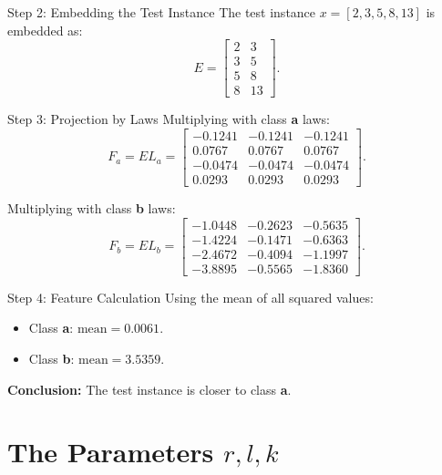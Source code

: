 \documentclass{beamer}
\begin{document}
\begin{frame}{Step 2: Embedding the Test Instance}
  The test instance \( x = [2, 3, 5, 8, 13] \) is embedded as:
  \begin{equation}
    E = \begin{bmatrix} 2 & 3 \\ 3 & 5 \\ 5 & 8 \\ 8 & 13 \end{bmatrix}.
  \end{equation}
\end{frame}

\begin{frame}{Step 3: Projection by Laws}
  Multiplying with class \textbf{a} laws:
  \begin{equation}
    F_a = E L_a = \begin{bmatrix} -0.1241 & -0.1241 & -0.1241 \\ 0.0767 & 0.0767 & 0.0767 \\ -0.0474 & -0.0474 & -0.0474 \\ 0.0293 & 0.0293 & 0.0293 \end{bmatrix}.
  \end{equation}

  Multiplying with class \textbf{b} laws:
  \begin{equation}
    F_b = E L_b = \begin{bmatrix} -1.0448 & -0.2623 & -0.5635 \\ -1.4224 & -0.1471 & -0.6363 \\ -2.4672 & -0.4094 & -1.1997 \\ -3.8895 & -0.5565 & -1.8360 \end{bmatrix}.
  \end{equation}
\end{frame}

\begin{frame}{Step 4: Feature Calculation}
  Using the mean of all squared values:
  \begin{itemize}
    \item Class \textbf{a}: \( \text{mean} = 0.0061 \).
    \item Class \textbf{b}: \( \text{mean} = 3.5359 \).
  \end{itemize}

  \textbf{Conclusion:} The test instance is closer to class \textbf{a}.
\end{frame}

\section{The Parameters \( r, l, k \)}
\end{document}

